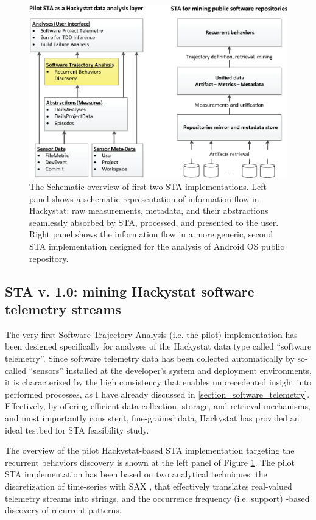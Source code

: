 \begin{figure}[t]
   \centering
   \includegraphics[width=150mm]{figures/STA12-schema-draft.eps}
   \caption{The Schematic overview of first two STA implementations. 
   Left panel shows a schematic representation of information flow in Hackystat: raw measurements, metadata, 
   and their abstractions seamlessly absorbed by STA, processed, and presented to the user.
   Right panel shows the information flow in a more generic, second STA implementation designed for the 
   analysis of Android OS public repository.}
   \label{fig:STA12-schema}
\end{figure}

\subsection{STA v. 1.0: mining Hackystat software telemetry streams}
The very first Software Trajectory Analysis (i.e. the pilot) implementation has been designed specifically for analyses 
of the Hackystat data type called ``software telemetry''. Since software telemetry data has been collected automatically 
by so-called ``sensors'' installed at the developer's system and deployment environments, it is characterized by the high 
consistency that enables unprecedented insight into performed processes, 
as I have already discussed in \ref{section_software_telemetry}. 
Effectively, by offering efficient data collection, storage, and retrieval mechanisms, and most importantly consistent, 
fine-grained data, Hackystat has provided an ideal testbed for STA feasibility study.

The overview of the pilot Hackystat-based STA implementation targeting the recurrent behaviors discovery is shown 
at the left panel of Figure  \ref{fig:STA12-schema}.
The pilot STA implementation has been based on two analytical techniques: the discretization of time-series with SAX \cite{sax}, 
that effectively translates real-valued telemetry streams into strings, and the occurrence frequency (i.e. support) -based 
discovery of recurrent patterns.

